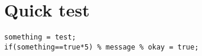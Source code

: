 \documentclass{article}
\begin{document}
\section{Quick test}



\begin{verbatim}
something = test;
if(something==true*5) % message % okay = true;
\end{verbatim}

\begin{verbatim}
    
\end{verbatim}
\end{document}
